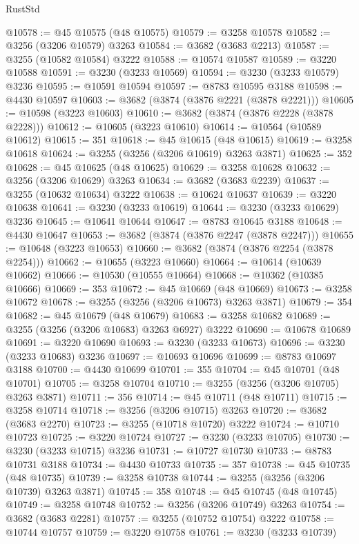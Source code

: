 \begin{lexlean}{RustStd}
\begin{coremodule}
@10578 := @45 @10575 (@48 @10575)
@10579 := @3258 @10578
@10582 := @3256 (@3206 @10579) @3263
@10584 := @3682 (@3683 @2213)
@10587 := @3255 (@10582 @10584) @3222
@10588 := @10574 @10587
@10589 := @3220 @10588
@10591 := @3230 (@3233 @10569)
@10594 := @3230 (@3233 @10579) @3236
@10595 := @10591 @10594
@10597 := @8783 @10595 @3188
@10598 := @4430 @10597
@10603 := @3682 (@3874 (@3876 @2221 (@3878 @2221)))
@10605 := @10598 (@3223 @10603)
@10610 := @3682 (@3874 (@3876 @2228 (@3878 @2228)))
@10612 := @10605 (@3223 @10610)
@10614 := @10564 (@10589 @10612)
@10615 := 351
@10618 := @45 @10615 (@48 @10615)
@10619 := @3258 @10618
@10624 := @3255 (@3256 (@3206 @10619) @3263 @3871)
@10625 := 352
@10628 := @45 @10625 (@48 @10625)
@10629 := @3258 @10628
@10632 := @3256 (@3206 @10629) @3263
@10634 := @3682 (@3683 @2239)
@10637 := @3255 (@10632 @10634) @3222
@10638 := @10624 @10637
@10639 := @3220 @10638
@10641 := @3230 (@3233 @10619)
@10644 := @3230 (@3233 @10629) @3236
@10645 := @10641 @10644
@10647 := @8783 @10645 @3188
@10648 := @4430 @10647
@10653 := @3682 (@3874 (@3876 @2247 (@3878 @2247)))
@10655 := @10648 (@3223 @10653)
@10660 := @3682 (@3874 (@3876 @2254 (@3878 @2254)))
@10662 := @10655 (@3223 @10660)
@10664 := @10614 (@10639 @10662)
@10666 := @10530 (@10555 @10664)
@10668 := @10362 (@10385 @10666)
@10669 := 353
@10672 := @45 @10669 (@48 @10669)
@10673 := @3258 @10672
@10678 := @3255 (@3256 (@3206 @10673) @3263 @3871)
@10679 := 354
@10682 := @45 @10679 (@48 @10679)
@10683 := @3258 @10682
@10689 := @3255 (@3256 (@3206 @10683) @3263 @6927) @3222
@10690 := @10678 @10689
@10691 := @3220 @10690
@10693 := @3230 (@3233 @10673)
@10696 := @3230 (@3233 @10683) @3236
@10697 := @10693 @10696
@10699 := @8783 @10697 @3188
@10700 := @4430 @10699
@10701 := 355
@10704 := @45 @10701 (@48 @10701)
@10705 := @3258 @10704
@10710 := @3255 (@3256 (@3206 @10705) @3263 @3871)
@10711 := 356
@10714 := @45 @10711 (@48 @10711)
@10715 := @3258 @10714
@10718 := @3256 (@3206 @10715) @3263
@10720 := @3682 (@3683 @2270)
@10723 := @3255 (@10718 @10720) @3222
@10724 := @10710 @10723
@10725 := @3220 @10724
@10727 := @3230 (@3233 @10705)
@10730 := @3230 (@3233 @10715) @3236
@10731 := @10727 @10730
@10733 := @8783 @10731 @3188
@10734 := @4430 @10733
@10735 := 357
@10738 := @45 @10735 (@48 @10735)
@10739 := @3258 @10738
@10744 := @3255 (@3256 (@3206 @10739) @3263 @3871)
@10745 := 358
@10748 := @45 @10745 (@48 @10745)
@10749 := @3258 @10748
@10752 := @3256 (@3206 @10749) @3263
@10754 := @3682 (@3683 @2281)
@10757 := @3255 (@10752 @10754) @3222
@10758 := @10744 @10757
@10759 := @3220 @10758
@10761 := @3230 (@3233 @10739)

\end{coremodule}
\end{lexlean}

